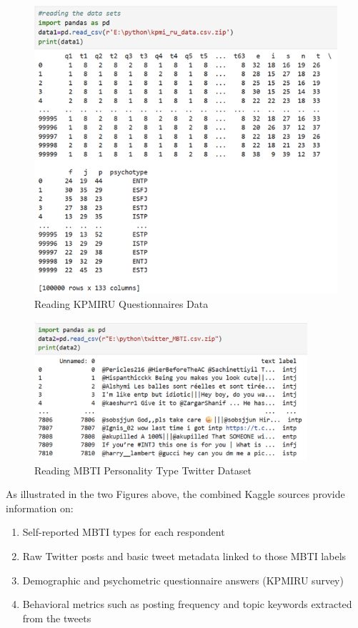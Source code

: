 \documentclass[12pt]{article}
\numberwithin{figure}{section}  %
\begin{document}
	\begin{figure}[H]
		\centering
		\includegraphics{Q1P1} 
		\caption{Reading KPMIRU Questionnaires Data}
	
	\end{figure}
	\begin{figure}[H]
		\centering
		\includegraphics[width=0.9\textwidth]{Q1P2}
		\caption{Reading MBTI Personality Type Twitter Dataset}
	\end{figure}
	As illustrated in the two Figures above, the combined Kaggle sources provide information on:
	\begin{enumerate}
		\item Self-reported MBTI types for each respondent
		\item Raw Twitter posts and basic tweet metadata linked to those MBTI
		labels  
		\item Demographic and psychometric questionnaire answers (KPMIRU survey) 
		\item Behavioral metrics such as posting frequency and topic keywords
		extracted from the tweets
	\end{enumerate}
\end{document}
